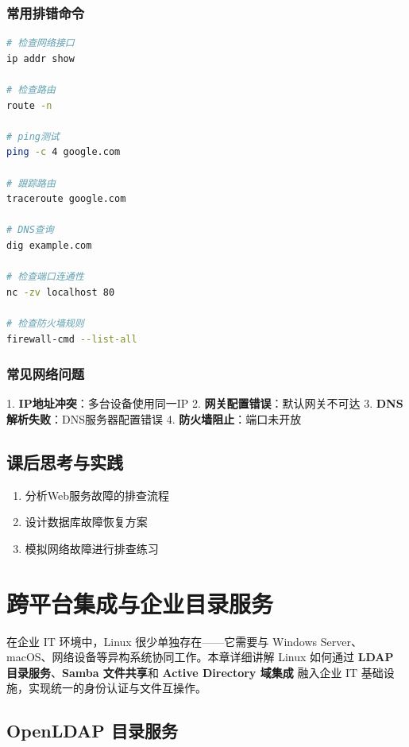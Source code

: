 \documentclass[12pt,UTF8]{ctexbook}
\begin{document}
\subsection*{常用排错命令}
\begin{lstlisting}[language=bash]
# 检查网络接口
ip addr show

# 检查路由
route -n

# ping测试
ping -c 4 google.com

# 跟踪路由
traceroute google.com

# DNS查询
dig example.com

# 检查端口连通性
nc -zv localhost 80

# 检查防火墙规则
firewall-cmd --list-all
\end{lstlisting}

\subsection*{常见网络问题}
1. \textbf{IP地址冲突}：多台设备使用同一IP
2. \textbf{网关配置错误}：默认网关不可达
3. \textbf{DNS解析失败}：DNS服务器配置错误
4. \textbf{防火墙阻止}：端口未开放

\section{课后思考与实践}
\label{sec:enterprise-troubleshoot-practice}
\begin{enumerate}
    \item 分析Web服务故障的排查流程
    \item 设计数据库故障恢复方案
    \item 模拟网络故障进行排查练习
\end{enumerate}

\chapter{跨平台集成与企业目录服务}
\label{chap:cross-platform-integration}

在企业 IT 环境中，Linux 很少单独存在——它需要与 Windows Server、macOS、网络设备等异构系统协同工作。本章详细讲解 Linux 如何通过 \textbf{LDAP 目录服务}、\textbf{Samba 文件共享}和 \textbf{Active Directory 域集成} 融入企业 IT 基础设施，实现统一的身份认证与文件互操作。

\section{OpenLDAP 目录服务}
\label{sec:openldap}
\end{document}
